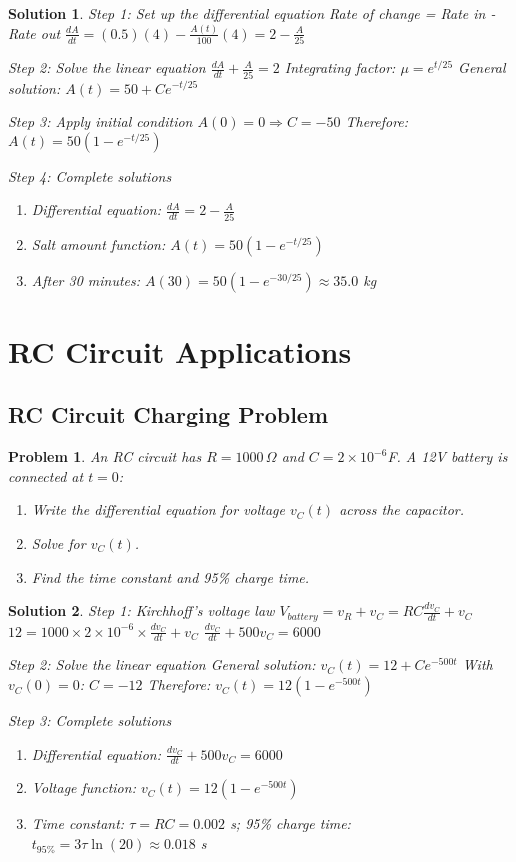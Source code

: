 \documentclass[12pt, letterpaper]{book}
\newcounter{problemcounter}[chapter]
\theoremstyle{problemstyle}
\newtheorem{problem}[problemcounter]{Problem}
\theoremstyle{solutionstyle}
\newtheorem*{solution}{Solution}
\begin{document}
\begin{solution}
\textit{Step 1: Set up the differential equation}
Rate of change = Rate in - Rate out
$\frac{dA}{dt} = (0.5)(4) - \frac{A(t)}{100}(4) = 2 - \frac{A}{25}$

\textit{Step 2: Solve the linear equation}
$\frac{dA}{dt} + \frac{A}{25} = 2$
Integrating factor: $\mu = e^{t/25}$
General solution: $A(t) = 50 + Ce^{-t/25}$

\textit{Step 3: Apply initial condition}
$A(0) = 0 \Rightarrow C = -50$
Therefore: $A(t) = 50(1 - e^{-t/25})$

\textit{Step 4: Complete solutions}
\begin{enumerate}
    \item Differential equation: $\frac{dA}{dt} = 2 - \frac{A}{25}$
    \item Salt amount function: $A(t) = 50(1 - e^{-t/25})$
    \item After 30 minutes: $A(30) = 50(1 - e^{-30/25}) \approx 35.0$ kg
\end{enumerate}
\end{solution}

\section{RC Circuit Applications}

\subsection{RC Circuit Charging Problem}

\begin{problem}
An RC circuit has $R = 1000\,\Omega$ and $C = 2 \times 10^{-6}$F. A 12V battery is connected at $t = 0$:
\begin{enumerate}
    \item Write the differential equation for voltage $v_C(t)$ across the capacitor.
    \item Solve for $v_C(t)$.
    \item Find the time constant and 95\% charge time.
\end{enumerate}
\end{problem}

\begin{solution}
\textit{Step 1: Kirchhoff's voltage law}
$V_{battery} = v_R + v_C = RC\frac{dv_C}{dt} + v_C$
$12 = 1000 \times 2 \times 10^{-6} \times \frac{dv_C}{dt} + v_C$
$\frac{dv_C}{dt} + 500v_C = 6000$

\textit{Step 2: Solve the linear equation}
General solution: $v_C(t) = 12 + Ce^{-500t}$
With $v_C(0) = 0$: $C = -12$
Therefore: $v_C(t) = 12(1 - e^{-500t})$

\textit{Step 3: Complete solutions}
\begin{enumerate}
    \item Differential equation: $\frac{dv_C}{dt} + 500v_C = 6000$
    \item Voltage function: $v_C(t) = 12(1 - e^{-500t})$
    \item Time constant: $\tau = RC = 0.002$ s; 95\% charge time: $t_{95\%} = 3\tau \ln(20) \approx 0.018$ s
\end{enumerate}
\end{solution}
\end{document}
